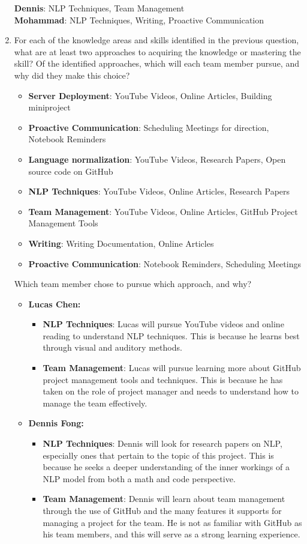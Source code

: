 \documentclass[12pt]{article}
\begin{document}
\begin{enumerate}
    \textbf{Dennis}: NLP Techniques, Team Management \\
    \textbf{Mohammad}: NLP Techniques, Writing, Proactive Communication
  \item For each of the knowledge areas and skills identified in the previous
  question, what are at least two approaches to acquiring the knowledge or
  mastering the skill?  Of the identified approaches, which will each team
  member pursue, and why did they make this choice?
    \begin{itemize}
        \item \textbf{Server Deployment}: YouTube Videos, Online Articles, Building miniproject
        \item \textbf{Proactive Communication}: Scheduling Meetings for direction, Notebook Reminders
        \item \textbf{Language normalization}: YouTube Videos, Research Papers, Open source code on GitHub
        \item \textbf{NLP Techniques}: YouTube Videos, Online Articles, Research Papers
        \item \textbf{Team Management}: YouTube Videos, Online Articles, GitHub Project Management Tools
        \item \textbf{Writing}: Writing Documentation, Online Articles
        \item \textbf{Proactive Communication}: Notebook Reminders, Scheduling Meetings
    \end{itemize}
    Which team member chose to pursue which approach, and why?
    \begin{itemize}
        \item \textbf{Lucas Chen:} 
        \begin{itemize}
            \item \textbf{NLP Techniques}: Lucas will pursue YouTube videos and online reading to understand NLP techniques. This is because he learns best through visual and auditory methods.
            \item \textbf{Team Management}: Lucas will pursue learning more about GitHub project management tools and techniques. This is because he has taken on the role of project manager and needs to understand how to manage the team effectively.
        \end{itemize}
        \item \textbf{Dennis Fong:}
        \begin{itemize}
            \item \textbf{NLP Techniques}: Dennis will look for research papers on NLP, especially ones that pertain to the topic of this project. This is because he seeks a deeper understanding of the inner workings of a NLP model from both a math and code perspective.
            \item \textbf{Team Management}: Dennis will learn about team management through the use of GitHub and the many features it supports for managing a project for the team. He is not as familiar with GitHub as his team members, and this will serve as a strong learning experience.
        \end{itemize}


\end{itemize}
\end{enumerate}
\end{document}

